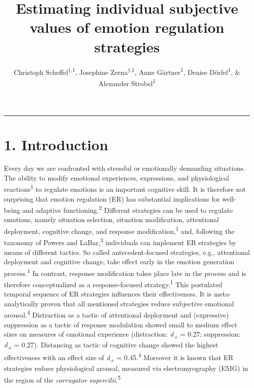 \documentclass[
  english,
  man,floatsintext]{apa6}
\title{Estimating individual subjective values of emotion regulation strategies}
\author{Christoph Scheffel\textsuperscript{$\dagger{}$,1}, Josephine Zerna\textsuperscript{$\dagger{}$,1}, Anne Gärtner\textsuperscript{1}, Denise Dörfel\textsuperscript{1}, \& Alexander Strobel\textsuperscript{1}}
\date{}
\affiliation{\vspace{0.5cm}\textsuperscript{1} Faculty of Psychology, Technische Universität Dresden, 01069 Dresden, Germany}
\begin{document}
\maketitle

\renewcommand\thesection{\Alph{section}}
\setcounter{figure}{0}

\begin{center}\rule{0.5\linewidth}{0.5pt}\end{center}

\hypertarget{introduction}{%
\section{1. Introduction}\label{introduction}}

Every day we are confronted with stressful or emotionally demanding situations.
The ability to modify emotional experiences, expressions, and physiological reactions\textsuperscript{1} to regulate emotions is an important cognitive skill.
It is therefore not surprising that emotion regulation (ER) has substantial implications for well-being and adaptive functioning.\textsuperscript{2}
Different strategies can be used to regulate emotions, namely situation selection, situation modification, attentional deployment, cognitive change, and response modification,\textsuperscript{1} and, following the taxonomy of Powers and LaBar,\textsuperscript{3} individuals can implement ER strategies by means of different tactics.
So called antecedent-focused strategies, e.g., attentional deployment and cognitive change, take effect early in the emotion generation process.\textsuperscript{1}
In contrast, response modification takes place late in the process and is therefore conceptualized as a response-focused strategy.\textsuperscript{1}
This postulated temporal sequence of ER strategies influences their effectiveness.
It is meta-analytically proven that all mentioned strategies reduce subjective emotional arousal.\textsuperscript{4}
Distraction as a tactic of attentional deployment and (expressive) suppression as a tactic of response modulation showed small to medium effect sizes on measures of emotional experience (distraction: \emph{d\textsubscript{+}} = 0.27; suppression: \emph{d\textsubscript{+}} = 0.27).
Distancing as tactic of cognitive change showed the highest effectiveness with an effect size of \emph{d\textsubscript{+}} = 0.45.\textsuperscript{4}
Moreover it is known that ER strategies reduce physiological arousal, measured via electromyography (EMG) in the region of the \emph{corrugator supercilii}.\textsuperscript{5}
\end{document}
